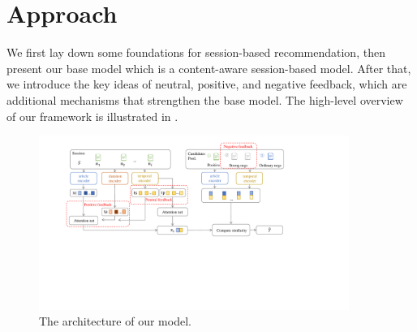 \section{Approach}
\label{sec:approach}
We first lay down some foundations for session-based recommendation, 
then present our base model which is a content-aware session-based model.
After that, we introduce the key ideas of neutral, positive, 
and negative feedback,
which are additional mechanisms that strengthen the base model. 
The high-level overview of our framework is illustrated in . 

\begin{figure}[th]
    \centering
    \includegraphics[width=0.9\textwidth]{fig/architecture.pdf}
    \caption{The architecture of our model.}
    \label{fig:arch}
\end{figure}

